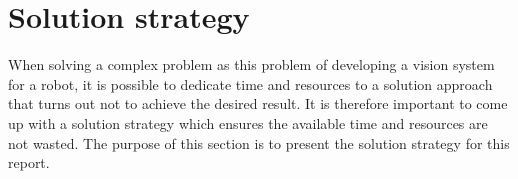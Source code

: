 \section{Solution strategy}
When solving a complex problem as this problem of developing a vision system for a robot, it is possible to dedicate time and resources to a solution approach that turns out not to achieve the desired result. It is therefore important to come up with a solution strategy which ensures the available time and resources are not wasted. The purpose of this section is to present the solution strategy for this report.


